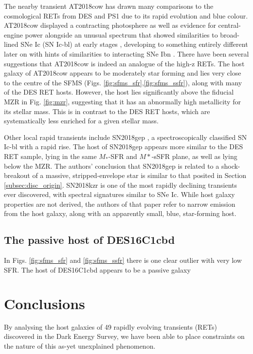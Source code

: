 \documentclass[fleqn,usenatbib,]{mnras}
\begin{document}
The nearby transient AT2018cow has drawn many comparisons to the cosmological RETs from DES and PS1 \citep[e.g.][]{Perley2019,Margutti2019,Mohan2020,Fox2020} due to its rapid evolution and blue colour. AT2018cow displayed a contracting photosphere as well as evidence for central-engine power alongside an unusual spectrum that showed similarities to broad-lined SNe Ic (SN Ic-bl) at early stages \citep[e.g.][]{Xu2018,Izzo2018} , developing to something entirely different later on \citep{Perley2019} with hints of similarities to interacting SNe Ibn \citep{Fox2020}. There have been several suggestions that AT2018cow is indeed an analogue of the high-z RETs. The host galaxy of AT2018cow appears to be moderately star forming and lies very close to the centre of the SFMS (Figs. \ref{fig:sfms_sfr},\ref{fig:sfms_ssfr}), along with many of the DES RET hosts. However, the host lies significantly above the fiducial MZR in Fig. \ref{fig:mzr}, suggesting that it has an abnormally high metallicity for its stellar mass. This is in contrast to the DES RET hosts, which are systematically less enriched for a given stellar mass. 

Other local rapid transients include SN2018gep \citep{Ho2019}, a spectroscopically classified SN Ic-bl with a rapid rise. The host of SN2018gep appears more similar to the DES RET sample, lying in the same $M_*$-SFR and $M*$-sSFR plane, as well as lying below the MZR. The authors' conclusion that SN2018gep is related to a shock-breakout of a massive, stripped-envelope star is similar to that posited in Section \ref{subsec:disc_origin}. SN2018kzr \citep{McBrien2019} is one of the most rapidly declining transients ever discovered, with spectral signatures similar to SNe Ic. While host galaxy properties are not derived, the authors of that paper refer to narrow emission from the host galaxy, along with an apparently small, blue, star-forming host. 

\subsection{The passive host of DES16C1cbd \label{subsec:disc_cbd}}
In Figs. \ref{fig:sfms_sfr} and \ref{fig:sfms_ssfr} there is one clear outlier with very low SFR. The host of DES16C1cbd appears to be a passive galaxy
\section{Conclusions}

By analysing the host galaxies of 49 rapidly evolving transients (RETs) discovered in the Dark Energy Survey, we have been able to place constraints on the nature of this as-yet unexplained phenomenon. 
\end{document}

